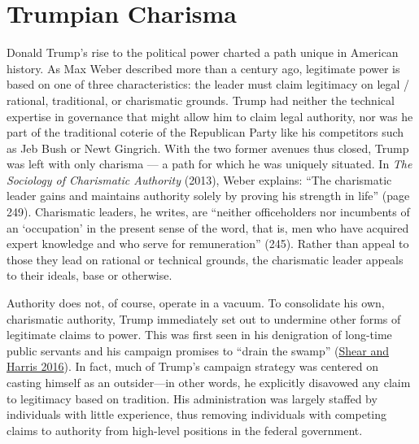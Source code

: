 \documentclass[
  12pt,
]{article}
\begin{document}
\hypertarget{trumpian-charisma}{%
\section*{Trumpian Charisma}\label{trumpian-charisma}}

Donald Trump's rise to the political power charted a path unique in American history. As Max Weber described more than a century ago, legitimate power is based on one of three characteristics: the leader must claim legitimacy on legal / rational, traditional, or charismatic grounds. Trump had neither the technical expertise in governance that might allow him to claim legal authority, nor was he part of the traditional coterie of the Republican Party like his competitors such as Jeb Bush or Newt Gingrich. With the two former avenues thus closed, Trump was left with only charisma --- a path for which he was uniquely situated. In \emph{The Sociology of Charismatic Authority} (2013), Weber explains: ``The charismatic leader gains and maintains authority solely by proving his strength in life'' (page 249). Charismatic leaders, he writes, are ``neither officeholders nor incumbents of an `occupation' in the present sense of the word, that is, men who have acquired expert knowledge and who serve for remuneration'' (245). Rather than appeal to those they lead on rational or technical grounds, the charismatic leader appeals to their ideals, base or otherwise.

Authority does not, of course, operate in a vacuum. To consolidate his own, charismatic authority, Trump immediately set out to undermine other forms of legitimate claims to power. This was first seen in his denigration of long-time public servants and his campaign promises to ``drain the swamp'' (\protect\hyperlink{ref-Shear2016}{Shear and Harris 2016}). In fact, much of Trump's campaign strategy was centered on casting himself as an outsider---in other words, he explicitly disavowed any claim to legitimacy based on tradition. His administration was largely staffed by individuals with little experience, thus removing individuals with competing claims to authority from high-level positions in the federal government.
\end{document}
